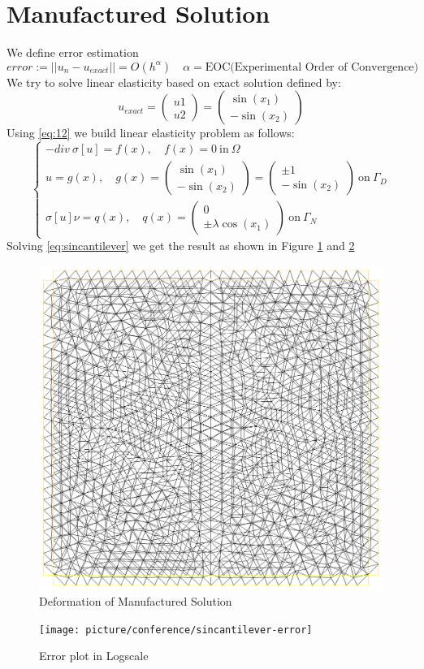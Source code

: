 \documentclass[a4paper,11pt]{article}
\begin{document}
\section{Manufactured Solution}
We define error estimation
\begin{equation}
error:=||u_n-u_{exact}|| = O(h^\alpha)\quad \alpha=\text{EOC(Experimental Order of Convergence)}
\end{equation}
We try to solve linear elasticity based on exact solution defined by:
\begin{equation}\label{eq:12}
u_{exact} = \begin{pmatrix}
u1\\
u2
\end{pmatrix} = \begin{pmatrix}
\sin(x_1)\\
-\sin(x_2)
\end{pmatrix}
\end{equation}
Using \eqref{eq:12} we build linear elasticity problem as follows:
\begin{equation}\label{eq:sincantilever}
\begin{cases}
-div\ \sigma[u]=f(x),\quad f(x)=0\ \text{in}\ \Omega\\

u=g(x),\quad g(x) = \begin{pmatrix}
\sin(x_1)\\
-\sin(x_2)
\end{pmatrix} = \begin{pmatrix}
\pm 1\\
-\sin(x_2)
\end{pmatrix}\ \text{on}\ \Gamma_D\\

\sigma[u] \nu = q(x), \quad q(x) = \begin{pmatrix}
0\\
\pm \lambda \cos(x_1)
\end{pmatrix}\ \text{on}\ \Gamma_N
\end{cases}
\end{equation}
Solving \eqref{eq:sincantilever} we get the result as shown in Figure \ref{fig:sincantilever-mesh} and \ref{fig:sincantilever-error}
\begin{figure}[h!]
	\centering
	\includegraphics[width=0.7\linewidth]{picture/conference/sincantilever-mesh}
	\caption{Deformation of Manufactured Solution}
	\label{fig:sincantilever-mesh}
\end{figure}
\begin{figure}[h!]
	\centering
	\texttt{[image: picture/conference/sincantilever-error]}
	\caption{Error plot in Logscale}
	\label{fig:sincantilever-error}
\end{figure}
\end{document}
